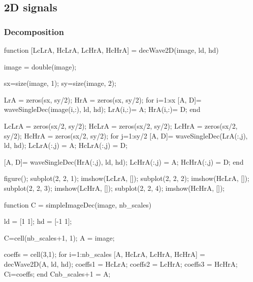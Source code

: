 \subsection{2D signals}
\subsubsection{Decomposition}
\begin{matlab}
function [LcLrA, HcLrA, LcHrA, HcHrA] = decWave2D(image, ld, hd)

image = double(image);

sx=size(image, 1);
sy=size(image, 2);

LrA = zeros(sx, sy/2);
HrA = zeros(sx, sy/2);
for i=1:sx
    [A, D]= waveSingleDec(image(i,:), ld, hd);
    LrA(i,:)= A;
    HrA(i,:)= D;
end


LcLrA = zeros(sx/2, sy/2);
HcLrA = zeros(sx/2, sy/2);
LcHrA = zeros(sx/2, sy/2);
HcHrA = zeros(sx/2, sy/2);
for j=1:sy/2
    [A, D]= waveSingleDec(LrA(:,j), ld, hd);
    LcLrA(:,j) = A;
    HcLrA(:,j) = D;
    
    [A, D]= waveSingleDec(HrA(:,j), ld, hd);
    LcHrA(:,j) = A;
    HcHrA(:,j) = D;
end

figure();
subplot(2, 2, 1); imshow(LcLrA, []);
subplot(2, 2, 2); imshow(HcLrA, []);
subplot(2, 2, 3); imshow(LcHrA, []);
subplot(2, 2, 4); imshow(HcHrA, []);
\end{matlab}

\begin{matlab}
function C = simpleImageDec(image, nb_scales)

ld = [1 1];
hd = [-1 1];

C=cell(nb_scales+1, 1);
A = image; %

coeffs = cell(3,1);
for i=1:nb_scales
    [A, HcLrA, LcHrA, HcHrA] = decWave2D(A, ld, hd);
    coeffs{1} = HcLrA;
    coeffs{2} = LcHrA;
    coeffs{3} = HcHrA;
    C{i}=coeffs;
end
C{nb_scales+1} = A;
\end{matlab}


